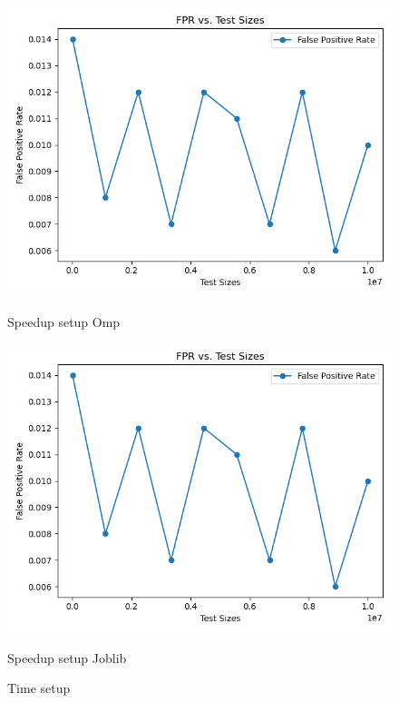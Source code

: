\documentclass[11pt]{article}
\begin{document}
    \begin{figure}[H]
        \centering
        \includegraphics[width=\linewidth]{plot_setup_fpr}
            \caption{Speedup setup Omp}\label{fig:setup_fpr_omp}
        \endminipage\hfill
        \includegraphics[width=\linewidth]{plot_setup_fpr}
            \caption{Speedup setup Joblib}\label{fig:setup_fpr_joblib}
        \endminipage\hfill
        \caption{Time setup}
    \end{figure}
\end{document}
